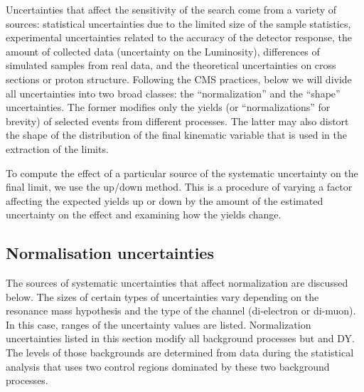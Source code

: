 Uncertainties that affect the sensitivity of the search come from a variety of sources: statistical uncertainties due to the limited size of the sample statistics, experimental uncertainties related to the accuracy of the detector response, the amount of collected data (uncertainty on the Luminosity), differences of simulated samples from real data, and the theoretical uncertainties on cross sections or proton structure. Following the CMS practices, below we will divide all uncertainties into two broad classes: the ``normalization'' and the ``shape'' uncertainties. The former modifies only the yields (or ``normalizations'' for brevity) of selected events from different processes. The latter may also distort the shape of the distribution of the final kinematic variable that is used in the extraction of the limits.

To compute the effect of a particular source of the systematic uncertainty on the final limit, we use the up/down method. This is a procedure of varying a factor affecting the expected yields up or down by the amount of the estimated uncertainty on the effect and examining how the yields change.

\subsection{Normalisation uncertainties}

The sources of systematic uncertainties that affect normalization are discussed below. The sizes of certain types of uncertainties vary depending on the resonance mass hypothesis and the type of the channel (di-electron or di-muon). In this case, ranges of the uncertainty values are listed. Normalization uncertainties listed in this section modify all background processes but \ttbar and DY. The levels of those backgrounds are determined from data during the statistical analysis that uses two control regions dominated by these two background processes.

